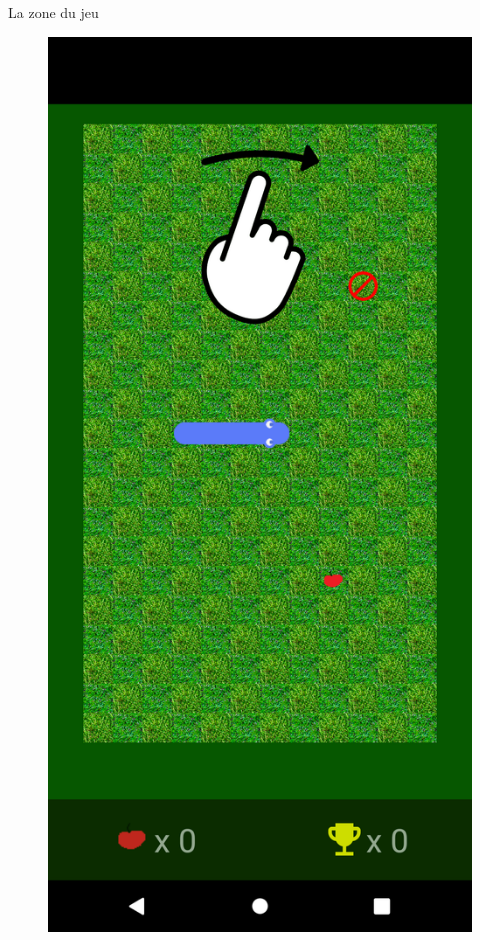 \documentclass{beamer}
\begin{document}
\begin{frame}{La zone du jeu}
\begin{figure}
\begin{minipage}[H]{0.33\linewidth}
    \end{minipage}\hfill
    \begin{minipage}[H]{0.33\linewidth}
    	\centering
        \includegraphics[scale=0.08]{Jeu.png}
    \end{minipage}\hfill
\end{figure}
\end{frame}
\end{document}
